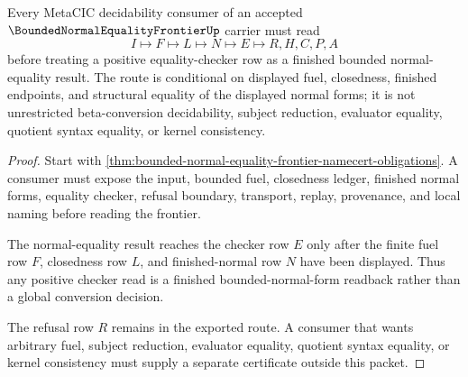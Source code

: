 \begin{theorem}
\label{thm:bounded-normal-equality-frontier-finished-soundness-route}
Every MetaCIC decidability consumer of an accepted $\BoundedNormalEqualityFrontierUp$ carrier must read
$$
I \longmapsto F \longmapsto L \longmapsto N \longmapsto E \longmapsto R,H,C,P,A
$$
before treating a positive equality-checker row as a finished bounded normal-equality result. The route is conditional on displayed fuel, closedness, finished endpoints, and structural equality of the displayed normal forms; it is not unrestricted beta-conversion decidability, subject reduction, evaluator equality, quotient syntax equality, or kernel consistency.
\end{theorem}
\begin{proof}
Start with \autoref{thm:bounded-normal-equality-frontier-namecert-obligations}. A consumer must expose the input, bounded fuel, closedness ledger, finished normal forms, equality checker, refusal boundary, transport, replay, provenance, and local naming before reading the frontier.

The normal-equality result reaches the checker row $E$ only after the finite fuel row $F$, closedness row $L$, and finished-normal row $N$ have been displayed. Thus any positive checker read is a finished bounded-normal-form readback rather than a global conversion decision.

The refusal row $R$ remains in the exported route. A consumer that wants arbitrary fuel, subject reduction, evaluator equality, quotient syntax equality, or kernel consistency must supply a separate certificate outside this packet.
\end{proof}



